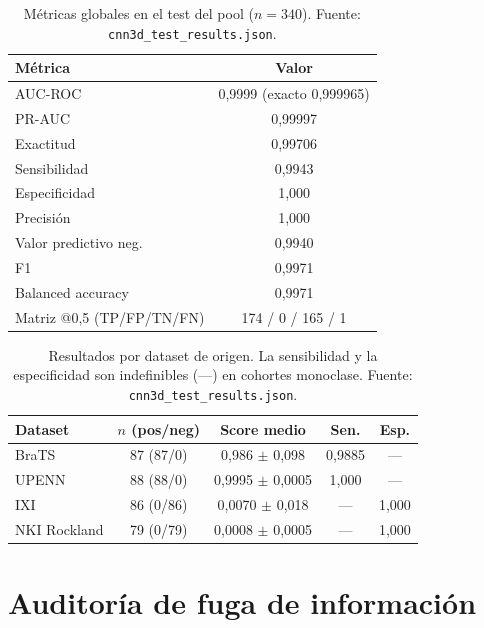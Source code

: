\begin{table}[ht]
  \centering
  \caption[Métricas globales del pool]{Métricas globales en el test del pool
  ($n=340$). Fuente: \texttt{cnn3d\_test\_results.json}.}
  \label{tab:apx_pool_glob}
  \begin{tabular}{l c}
    \hline
    \textbf{Métrica} & \textbf{Valor} \\
    \hline
    AUC-ROC               & 0,9999 (exacto 0,999965) \\
    PR-AUC                & 0,99997 \\
    Exactitud             & 0,99706 \\
    Sensibilidad          & 0,9943 \\
    Especificidad         & 1,000 \\
    Precisión             & 1,000 \\
    Valor predictivo neg. & 0,9940 \\
    F1                    & 0,9971 \\
    Balanced accuracy     & 0,9971 \\
    Matriz @0,5 (TP/FP/TN/FN) & 174 / 0 / 165 / 1 \\
    \hline
  \end{tabular}
\end{table}

\begin{table}[ht]
  \centering
  \caption[Resultados por dataset en el pool]{Resultados por dataset de origen.
  La sensibilidad y la especificidad son indefinibles (---) en cohortes
  monoclase. Fuente: \texttt{cnn3d\_test\_results.json}.}
  \label{tab:apx_pool_ds}
  \begin{tabular}{l c c c c}
    \hline
    \textbf{Dataset} & \textbf{$n$ (pos/neg)} & \textbf{Score medio} & \textbf{Sen.} & \textbf{Esp.} \\
    \hline
    BraTS        & 87 (87/0) & 0,986 $\pm$ 0,098  & 0,9885 & --- \\
    UPENN        & 88 (88/0) & 0,9995 $\pm$ 0,0005 & 1,000  & --- \\
    IXI          & 86 (0/86) & 0,0070 $\pm$ 0,018 & ---    & 1,000 \\
    NKI Rockland & 79 (0/79) & 0,0008 $\pm$ 0,0005 & ---    & 1,000 \\
    \hline
  \end{tabular}
\end{table}

\section{Auditoría de fuga de información}

